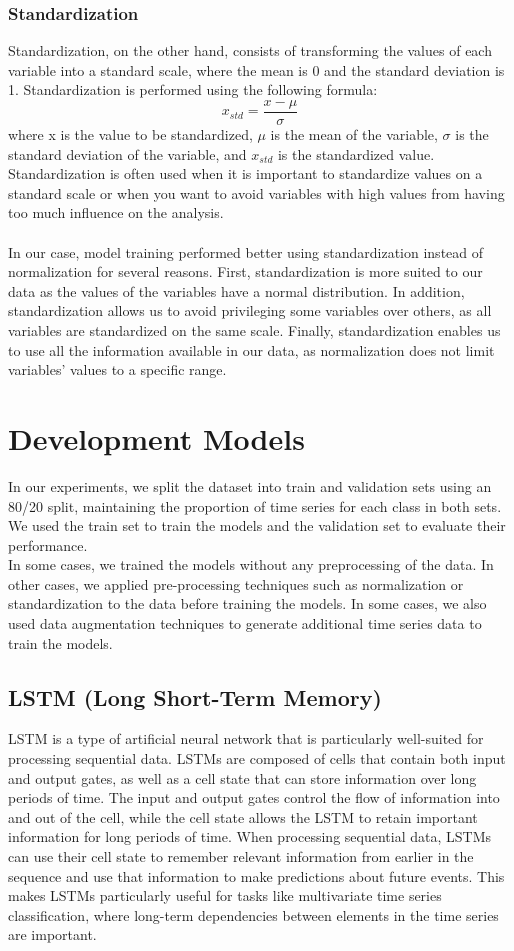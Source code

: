 \documentclass[11pt, oneside]{article}
\begin{document}
\subsubsection{Standardization}
Standardization, on the other hand, consists of transforming the values of each variable into a standard scale, where the mean is 0 and the standard deviation is 1. Standardization is performed using the following formula:
\[x_{std} = \frac{x - \mu}{\sigma} \]
where x is the value to be standardized, $\mu$ is the mean of the variable, $\sigma$ is the standard deviation of the variable, and $x_{std}$ is the standardized value.
Standardization is often used when it is important to standardize values on a standard scale or when you want to avoid variables with high values from having too much influence on the analysis.\\\\
In our case, model training performed better using standardization instead of normalization for several reasons. First, standardization is more suited to our data as the values of the variables have a normal distribution. In addition, standardization allows us to avoid privileging some variables over others, as all variables are standardized on the same scale. Finally, standardization enables us to use all the information available in our data, as normalization does not limit variables' values to a specific range.

\section{Development Models}
In our experiments, we split the dataset into train and validation sets using an 80/20 split, maintaining the proportion of time series for each class in both sets. We used the train set to train the models and the validation set to evaluate their performance.\\
In some cases, we trained the models without any preprocessing of the data. In other cases, we applied pre-processing techniques such as normalization or standardization to the data before training the models. In some cases, we also used data augmentation techniques to generate additional time series data to train the models.
\subsection{LSTM (Long Short-Term Memory)}
LSTM is a type of artificial neural network that is particularly well-suited for processing sequential data. LSTMs are composed of cells that contain both input and output gates, as well as a cell state that can store information over long periods of time. The input and output gates control the flow of information into and out of the cell, while the cell state allows the LSTM to retain important information for long periods of time. When processing sequential data, LSTMs can use their cell state to remember relevant information from earlier in the sequence and use that information to make predictions about future events. This makes LSTMs particularly useful for tasks like multivariate time series classification, where long-term dependencies between elements in the time series are important.
\end{document}
